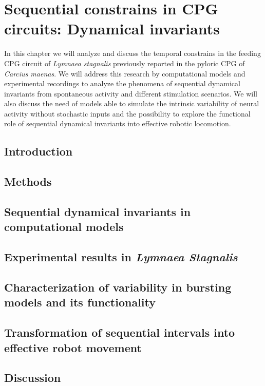 \chapter{Sequential constrains in CPG circuits: Dynamical invariants}
\label{c-invariants}
In this chapter we will analyze and discuss the temporal constrains in the feeding CPG circuit of \textit{Lymnaea stagnalis} previously reported in the pyloric CPG of \textit{Carcius maenas}. We will address this research by computational models and experimental recordings to analyze the phenomena of sequential dynamical invariants from spontaneous activity and different stimulation scenarios. We will also discuss the need of models able to simulate the intrinsic variability of neural activity without stochastic inputs and the possibility to explore the functional role of sequential dynamical invariants into effective robotic locomotion.

\section{Introduction}

\section{Methods}

\section{Sequential dynamical invariants in computational models}
\label{c-invariants-model}

\section{Experimental results in \textit{Lymnaea Stagnalis}}
\label{sec:experimental sussex}

\section{Characterization of variability in bursting models and its functionality}
\label{sec:model variability}

\section{Transformation of sequential intervals into effective robot movement}
\label{sec:robot}

\section{Discussion}

